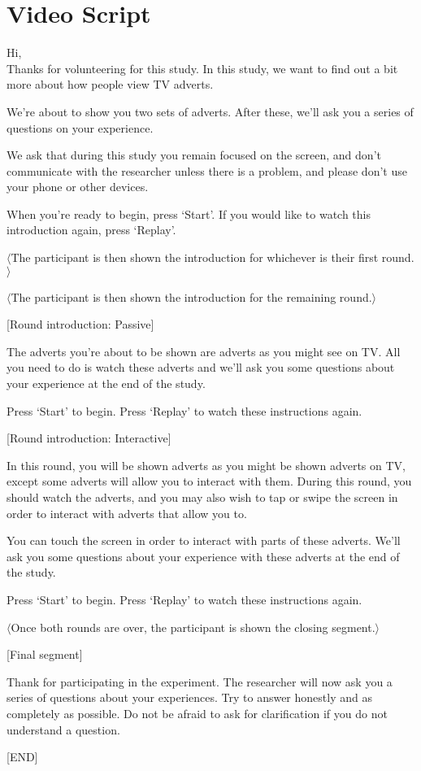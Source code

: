 \section{Video Script}
	\label{sec:appendix_video_script}
	Hi,\\
	Thanks for volunteering for this study. In this study, we want to find out a bit more about how people view TV adverts. 

	We're about to show you two sets of adverts. After these, we'll ask you a series of questions on your experience.

	We ask that during this study you remain focused on the screen, and don’t communicate with the researcher unless there is a problem, and please don’t use your phone or other devices.

	When you're ready to begin, press `Start'. If you would like to watch this introduction again, press `Replay'.

	$\langle$The participant is then shown the introduction for whichever is their first round.$\rangle$

	$\langle$The participant is then shown the introduction for the remaining round.$\rangle$

	[Round introduction: Passive]

	The adverts you're about to be shown are adverts as you might see on TV. All you need to do is watch these adverts and we'll ask you some questions about your experience at the end of the study.

	Press `Start' to begin. Press `Replay' to watch these instructions again.

	[Round introduction: Interactive]

	In this round, you will be shown adverts as you might be shown adverts on TV, except some adverts will allow you to interact with them. During this round, you should watch the adverts, and you may also wish to tap or swipe the screen in order to interact with adverts that allow you to. 

	You can touch the screen in order to interact with parts of these adverts. We'll ask you some questions about your experience with these adverts at the end of the study.

	Press `Start' to begin. Press `Replay' to watch these instructions again.
	
	$\langle$Once both rounds are over, the participant is shown the closing segment.$\rangle$

	[Final segment]

	Thank for participating in the experiment. The researcher will now ask you a series of questions about your experiences. Try to answer honestly and as completely as possible. Do not be afraid to ask for clarification if you do not understand a question.

	[END]
